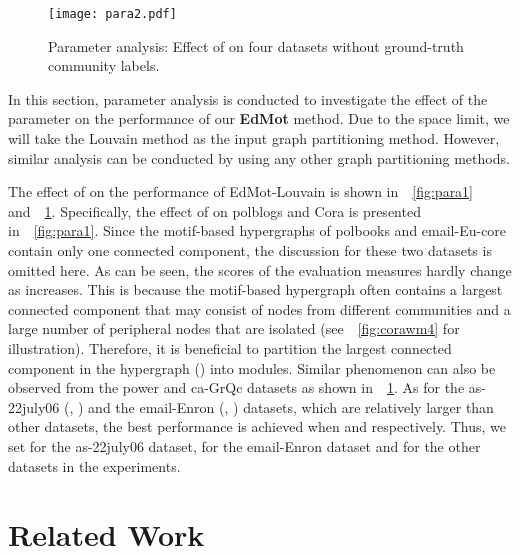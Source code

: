 \documentclass[sigconf]{acmart}
\begin{document}
\begin{figure}[!t]
\texttt{[image: para2.pdf]}\vskip-0.1in
\caption{Parameter analysis: Effect of  on four datasets without ground-truth community labels.} \label{fig:para2}
\vskip-0.1in
\end{figure}



In this section, parameter analysis is conducted to investigate the effect of the parameter  on the performance of our \textbf{EdMot} method. Due to the space limit, we will take the Louvain method as the input graph partitioning method. However, similar analysis can be conducted by using any other graph partitioning methods.





The effect of  on the performance of EdMot-Louvain is shown in~\figurename~\ref{fig:para1} and~\figurename~\ref{fig:para2}. Specifically, the effect of  on polblogs and Cora is presented in~\figurename~\ref{fig:para1}. Since the motif-based hypergraphs of polbooks and email-Eu-core contain only one connected component, the discussion for these two datasets is omitted here. As can be seen, the scores of the evaluation measures hardly change as  increases. This is because the motif-based hypergraph often contains a largest connected component that may consist of nodes from different communities and a large number of peripheral nodes that are isolated (see~\figurename~\ref{fig:corawm4} for illustration). Therefore, it is beneficial to partition the largest connected component in the hypergraph () into modules. Similar phenomenon can also be observed from the power and ca-GrQc datasets as shown in~\figurename~\ref{fig:para2}. As for the as-22july06 (, ) and the email-Enron (, ) datasets, which are relatively larger than other datasets, the best performance is achieved when  and  respectively. Thus, we set  for the as-22july06 dataset,  for the email-Enron dataset and  for the other datasets in the experiments.









\section{Related Work}
\label{sec:relatedwork}
\end{document}
